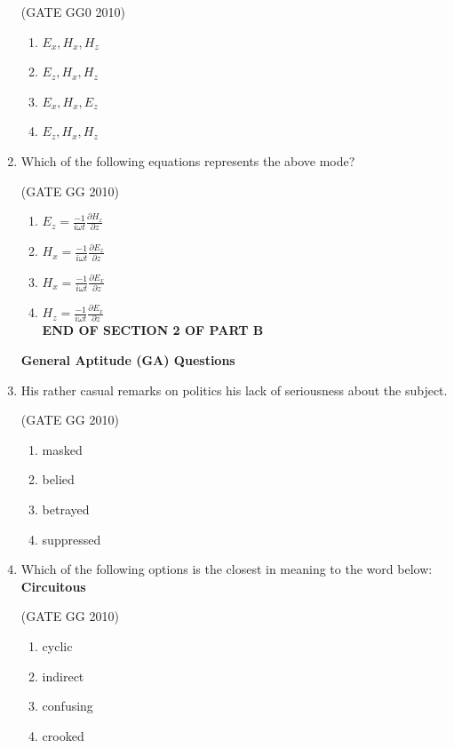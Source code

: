 \documentclass[journal]{IEEEtran}
\begin{document}
\begin{enumerate}[start=26]
\hfill{(GATE GG0 2010)}

\begin{enumerate}
    \item ${E_x,H_x,H_z}$
    \item ${E_z,H_x,H_z}$
    \item ${E_x,H_x,E_z}$
    \item ${E_z,H_x,H_z}$
\end{enumerate}

\item Which of the following equations represents the above mode?

\hfill{(GATE GG 2010)}

\begin{enumerate}
    \item ${E_z=\frac{-1}{i\omega t}\frac{\partial{H_z}}{\partial z}}$
    \vspace{0.3cm}
    \item ${H_x=\frac{-1}{i\omega t}\frac{\partial{E_z}}{\partial z}}$
      \vspace{0.3cm}
    \item ${H_x=\frac{-1}{i\omega t}\frac{\partial{E_x}}{\partial z}}$
      \vspace{0.3cm}
    \item ${H_z=\frac{-1}{i\omega t}\frac{\partial{E_x}}{\partial z}}$\\
    \vspace{0.5cm}
    \textbf{END OF SECTION 2 OF PART B}
\end{enumerate}
\vspace{3cm}
\textbf{General Aptitude (GA) Questions}
\item His rather casual remarks on politics his lack of seriousness about the subject.

\hfill{(GATE GG 2010)}

\begin{enumerate}
    \item  masked
\item  belied
\item  betrayed
\item  suppressed
\end{enumerate}

\item Which of the following options is the closest in meaning to the word below:\\
\textbf{Circuitous}

\hfill{(GATE GG 2010)}

\begin{enumerate}
    \item cyclic
\item  indirect
\item confusing
\item  crooked
\end{enumerate}


\end{enumerate}
\end{document}
